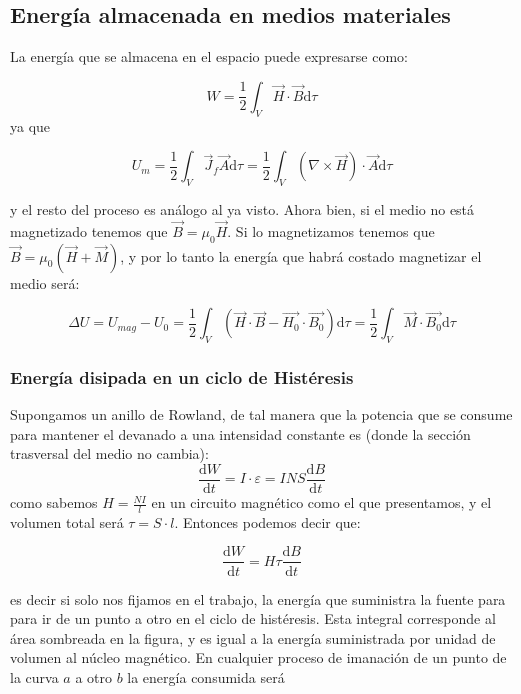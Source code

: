\documentclass[12pt]{article}
\newcommand{\D}{\mathrm{d}}
\begin{document}
\subsection{Energía almacenada en medios materiales}

La energía que se almacena en el espacio puede expresarse como:

\begin{equation}
W = \dfrac{1}{2} \int_V \vec{H} \cdot \vec{B} \D \tau
\end{equation}
ya que 

$$ U_m = \dfrac{1}{2} \int_V \vec{J}_f \vec{A} \D \tau = \dfrac{1}{2} \int_V (\nabla \times \vec{H}) \cdot \vec{A} \D \tau $$

y el resto del proceso es análogo al ya visto. Ahora bien, si el medio no está magnetizado tenemos que $\vec{B} = \mu_0 \vec{H}$. Si lo magnetizamos tenemos que $\vec{B} = \mu_0 (\vec{H}+\vec{M})$, y por lo tanto la energía que habrá costado magnetizar el medio será:

\begin{equation}
\Delta U = U_{mag} - U_0 = \dfrac{1}{2} \int_V (\vec{H} \cdot \vec{B} - \vec{H_0} \cdot \vec{B_0}) \D \tau = \dfrac{1}{2} \int_V \vec{M} \cdot \vec{B_0} \D \tau
\end{equation}


\subsubsection{Energía disipada en un ciclo de Histéresis}



Supongamos un anillo de Rowland, de tal manera que la potencia que se consume para mantener el devanado a una intensidad constante es (donde la sección trasversal del medio no cambia):
$$ \dfrac{\D W}{\D t} = I \cdot \varepsilon = I N S \dfrac{\D B}{\D t} $$
como sabemos $H = \frac{NI}{l}$ en un circuito magnético como el que presentamos, y el volumen total será $\tau = S \cdot l$. Entonces podemos decir que:

\begin{equation}
\dfrac{\D W}{\D t} = H \tau \dfrac{\D B}{\D t}
\end{equation}

es decir si solo nos fijamos en el trabajo, la energía que suministra la fuente para para ir de un punto a otro en el ciclo de histéresis. Esta integral corresponde al área sombreada en la figura, y es igual a la energía suministrada por unidad de volumen al núcleo magnético. En cualquier proceso de imanación de un punto de la curva $a$ a otro $b$ la energía consumida será
\end{document}
